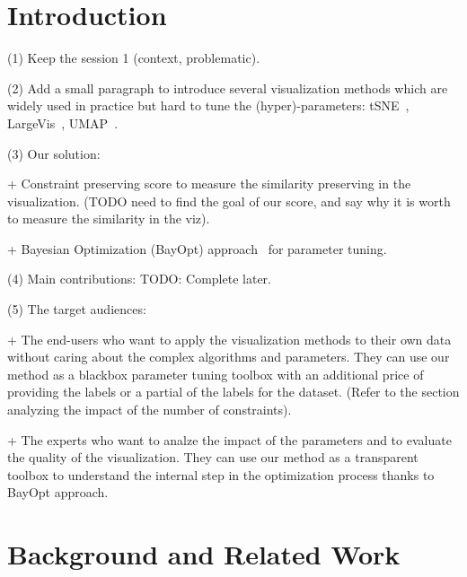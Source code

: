 \section{Introduction}

\par
(1) Keep the session 1 (context, problematic).

\vspace{8pt} \par
(2) Add a small paragraph to introduce several visualization methods which are widely used in practice but hard to tune the (hyper)-parameters:
tSNE~\cite{maaten2008tsne}, LargeVis~\cite{tang2016visualizing}, UMAP~\cite{mcinnes2018umap}.

\vspace{8pt} \par
(3) Our solution:

+ Constraint preserving score to measure the similarity preserving in the visualization. (TODO need to find the goal of our score, and say why it is worth to measure the similarity in the viz).

+ Bayesian Optimization (BayOpt) approach~\cite{mockus1978application, brochu2010tutorial} for parameter tuning.

\vspace{8pt} \par
(4) Main contributions: 
TODO: Complete later.


\vspace{8pt}
\par
(5) The target audiences:

+ The end-users who want to apply the visualization methods to their own data without caring about the complex algorithms and parameters.
They can use our method as a blackbox parameter tuning toolbox with an additional price of providing the labels or a partial of the labels for the dataset.
(Refer to the section analyzing the impact of the number of constraints).

+ The experts who want to analze the impact of the parameters and to evaluate the quality of the visualization.
They can use our method as a transparent toolbox to understand the internal step in the optimization process thanks to BayOpt approach.


\section{Background and Related Work}

